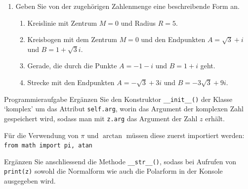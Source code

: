 \begin{ueb}
\begin{enumerate}
            \begin{enumerate}
                \item[(a)] $\{ z \in \mathbb{C} \mid |z| = 1 \}$
                \item[(b)] $\{ z \in \mathbb{C} \mid |z| \geq \sqrt{5} \}$
                \item[(c)] $\{ z \in \mathbb{C} \mid \arg(z) = 45^\circ \}$
                \item[(d)] $\{ z \in \mathbb{C} \mid |z| < 3 \text{ und } \pi \leq \arg(z) \leq \frac{3\pi}{2} \}$
            \end{enumerate}
         
        \item Geben Sie von der zugehörigen Zahlenmenge eine beschreibende Form an.
        \begin{enumerate}
            \item[(a)] Kreislinie mit Zentrum $M = 0$ und Radius $R = 5$.
            \item[(b)] Kreisbogen mit dem Zentrum $M = 0$ und den Endpunkten $A = \sqrt{3} + i$ und $B = 1 + \sqrt{3} i$.
            \item[(c)] Gerade, die durch die Punkte $A = -1 - i$ und $B = 1 + i$ geht.
            \item[(d)] Strecke mit den Endpunkten $A = -\sqrt{3} + 3i$ und $B = -3\sqrt{3} + 9i$.
        \end{enumerate}
    \end{enumerate}
\end{ueb}


\begin{ueb}
    {Programmieraufgabe}{}
    Ergänzen Sie den Konstruktor \lstinline{__init__()} der Klasse `komplex' um das Attribut \lstinline{self.arg}, worin das Argument der komplexen Zahl gespeichert wird, sodass man mit \lstinline{z.arg} das Argument der Zahl $z$ erhält.



    Für die Verwendung von $\pi$ und $\arctan$ müssen diese zuerst importiert werden: \lstinline{from math import pi, atan}

    Ergänzen Sie anschliessend die Methode \lstinline{__str__()}, sodass bei Aufrufen von \lstinline{print(z)} sowohl die Normalform wie auch die Polarform in der Konsole ausgegeben wird.
\end{ueb}




